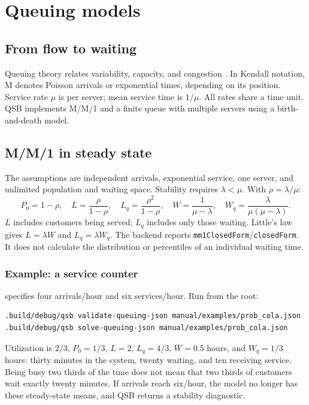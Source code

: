 \chapter{Queuing models}
\label{ch:colas}

\section{From flow to waiting}
Queuing theory relates variability, capacity, and congestion
\cite{gross2008fundamentals}. In Kendall notation, M denotes Poisson arrivals
or exponential times, depending on its position. Service rate \(\mu\) is
per server; mean service time is \(1/\mu\). All rates share a time unit.
QSB implements M/M/1 and a finite queue with multiple servers using a
birth-and-death model.

\section{M/M/1 in steady state}
The assumptions are independent arrivals, exponential service, one server,
and unlimited population and waiting space. Stability requires
\(\lambda<\mu\). With \(\rho=\lambda/\mu\):
\[
 P_0=1-\rho,\quad L=\frac{\rho}{1-\rho},\quad
 L_q=\frac{\rho^2}{1-\rho},\quad
 W=\frac1{\mu-\lambda},\quad W_q=\frac{\lambda}{\mu(\mu-\lambda)}.
\]
\(L\) includes customers being served; \(L_q\) includes only those waiting.
Little's law gives \(L=\lambda W\) and \(L_q=\lambda W_q\).
The backend reports \texttt{mm1ClosedForm}/\texttt{closedForm}. It does not
calculate the distribution or percentiles of an individual waiting time.

\subsection{Example: a service counter}
 specifies four arrivals/hour and six
services/hour. Run from the root:
\begin{lstlisting}
.build/debug/qsb validate-queuing-json manual/examples/prob_cola.json
.build/debug/qsb solve-queuing-json manual/examples/prob_cola.json
\end{lstlisting}
Utilization is \(2/3\), \(P_0=1/3\), \(L=2\), \(L_q=4/3\),
\(W=0.5\) hours, and \(W_q=1/3\) hours: thirty minutes in the system,
twenty waiting, and ten receiving service. Being busy two thirds of the time
does not mean that two thirds of customers wait exactly twenty minutes.
If arrivals reach six/hour, the model no longer has these steady-state means,
and QSB returns a stability diagnostic.

